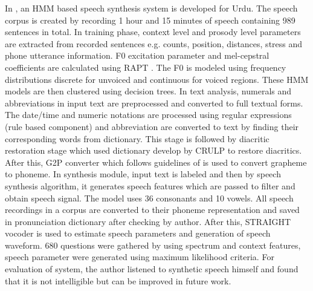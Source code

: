 In \cite{ahmed2014hmm}, an HMM based speech synthesis system is developed for Urdu. The speech corpus is created by recording 1 hour and 15 minutes of speech containing 989 sentences in total. In training phase, context level and prosody level parameters are extracted from recorded sentences e.g. counts, position, distances, stress and phone utterance information. F0 excitation parameter and mel-cepstral coefficients are calculated using RAPT \cite{kleijn1995speech}. The F0 is modeled using frequency distributions discrete for unvoiced and continuous for voiced regions. These HMM models are then clustered using decision trees. In text analysis, numerals and abbreviations in input text are preprocessed and converted to full textual forms. The date/time and numeric notations are processed using regular expressions (rule based component) and abbreviation are converted to text by finding their corresponding words from dictionary. This stage is followed by diacritic restoration stage which used dictionary develop by CRULP \cite{crulp} to restore diacritics. After this, G2P converter which follows guidelines of \cite{hussain2004sound} is used to convert grapheme to phoneme. In synthesis module, input text is labeled and then by speech synthesis algorithm, it generates speech features which are passed to filter and obtain speech signal. The model uses 36 consonants and 10 vowels. All speech recordings in a corpus are converted to their phoneme representation and saved in pronunciation dictionary after checking by author. After this, STRAIGHT vocoder is used to estimate speech parameters and generation of speech waveform. 680 questions were gathered by using spectrum and context features, speech parameter were generated using maximum likelihood criteria. For evaluation of system, the author listened to synthetic speech himself and found that it is not intelligible but can be improved in future work.

